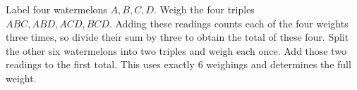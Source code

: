 Label four watermelons $A,B,C,D$. Weigh the four triples $ABC,ABD,ACD,BCD$. Adding these readings counts each of the four weights three times, so divide their sum by three to obtain the total of these four. Split the other six watermelons into two triples and weigh each once. Add those two readings to the first total. This uses exactly $\boxed6$ weighings and determines the full weight.
